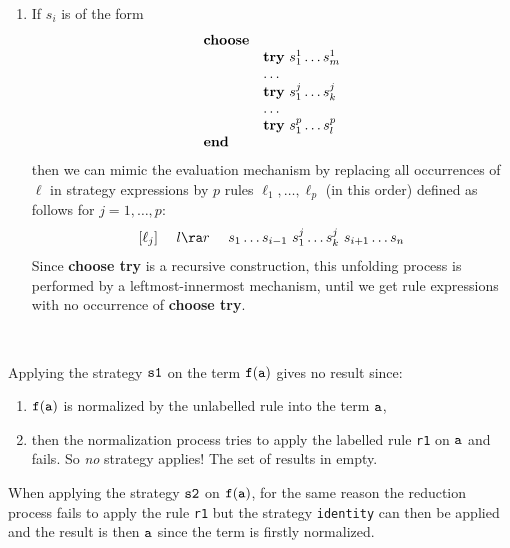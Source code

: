 \begin{enumerate}
\item If $s_i$ is of the form
\[
\begin{array}{ll}
{\bf choose} & \\
             & {\bf try}~ s_1^1 \ldots s_m^1 \\
             & \ldots \\
             & {\bf try}~ s_1^j \ldots s_k^j \\
             & \ldots \\
             & {\bf try}~ s_1^p \ldots s_l^p \\
{\bf end}    & \\
\end{array}
\]
then we can mimic the evaluation mechanism by replacing all
occurrences of $\ell$ in strategy expressions by $p$ rules
$\ell_1,\dots, \ell_p$ (in this order) defined as follows
for $j=1,\dots,p$:
$$
[\ell_j]~~~~  l \ra r ~~~~ s_1 \ldots s_{i-1} ~s_1^j \ldots s_k^j~
s_{i+1} \ldots s_n
$$
Since {\bf choose try} is a recursive construction, this unfolding
process is performed by a leftmost-innermost mechanism, until we get
rule expressions with no occurrence of {\bf choose try}.


\end{enumerate}




\EX~\\

\noindent
Applying the strategy $\tt s1$ on the term $\tt f(a)$ gives no result
since:
\begin{enumerate}
\item $\tt f(a)$ is normalized by  the unlabelled rule into the term
        $\tt a$,
\item then the normalization process  tries to apply the labelled rule
        {\tt r1} on $\tt  a$ and fails.  So {\em no} strategy applies!
        The set of results in empty.
\end{enumerate}
When applying the strategy $\tt s2$ on $\tt f(a)$, for the same reason
the reduction process fails to apply the rule {\tt r1} but the 
strategy {\tt identity} can then be applied and the result is then
$\tt a$ since the term is firstly normalized.

